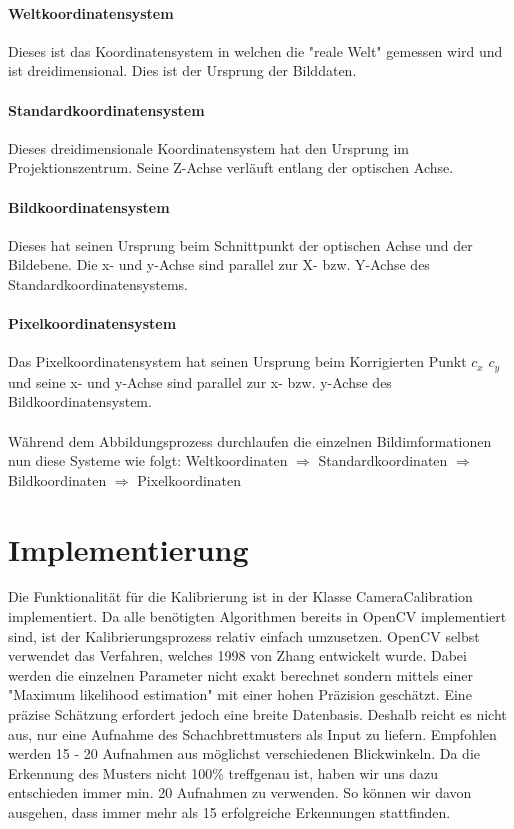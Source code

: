 \paragraph{Weltkoordinatensystem} Dieses ist das Koordinatensystem in welchen die "reale Welt" gemessen wird und ist dreidimensional. Dies ist der Ursprung der Bilddaten.

\paragraph{Standardkoordinatensystem} Dieses dreidimensionale Koordinatensystem hat den Ursprung im Projektionszentrum. Seine Z-Achse verläuft entlang der optischen Achse.

\paragraph{Bildkoordinatensystem} Dieses hat seinen Ursprung beim Schnittpunkt der optischen Achse und der Bildebene. Die x- und y-Achse sind parallel zur X- bzw. Y-Achse des Standardkoordinatensystems.

\paragraph{Pixelkoordinatensystem} Das Pixelkoordinatensystem hat seinen Ursprung beim Korrigierten Punkt $c_x$ \/ $c_y$  und seine x- und y-Achse sind parallel zur x- bzw. y-Achse des Bildkoordinatensystem.

\paragraph{} Während dem Abbildungsprozess durchlaufen die einzelnen Bildimformationen nun diese Systeme wie folgt: Weltkoordinaten $\Rightarrow$ Standardkoordinaten $\Rightarrow$ Bildkoordinaten $\Rightarrow$ Pixelkoordinaten

\section{Implementierung}
Die Funktionalität für die Kalibrierung ist in der Klasse CameraCalibration implementiert. Da alle benötigten Algorithmen bereits in OpenCV implementiert sind, ist der Kalibrierungsprozess relativ einfach umzusetzen. OpenCV selbst verwendet das Verfahren, welches 1998 von Zhang\cite{zhang} entwickelt wurde. Dabei werden die einzelnen Parameter nicht exakt berechnet sondern mittels einer "Maximum likelihood estimation" mit einer hohen Präzision geschätzt. Eine präzise Schätzung erfordert jedoch eine breite Datenbasis. Deshalb reicht es nicht aus, nur eine Aufnahme des Schachbrettmusters als Input zu liefern. Empfohlen werden 15 - 20 Aufnahmen aus möglichst verschiedenen Blickwinkeln. Da die Erkennung des Musters nicht 100\% treffgenau ist, haben wir uns dazu entschieden immer min. 20 Aufnahmen zu verwenden. So können wir davon ausgehen, dass immer mehr als 15 erfolgreiche Erkennungen stattfinden.

